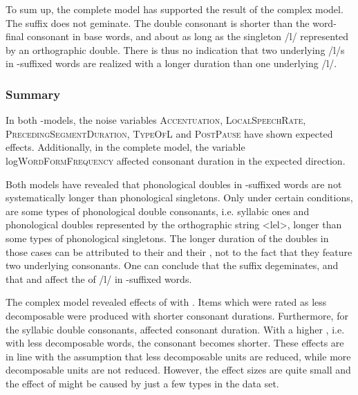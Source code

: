 To sum up, the complete model has supported the result of the complex model. The suffix  does not geminate. The double consonant is shorter than the word-final consonant in base words, and about as long as the singleton /l/ represented by an orthographic double. There is thus no indication that two underlying /l/s in -suffixed words are realized with a longer duration than one underlying /l/.




\subsubsection{Summary} \label{ly experiment summary}

In both -models, the noise variables \textsc{Accentuation}, \textsc{LocalSpeechRate}, \textsc{PrecedingSegmentDuration}, \textsc{TypeOfL} and \textsc{PostPause} have shown expected effects. Additionally, in the complete model, the variable log\textsc{WordFormFrequency} affected consonant duration in the expected direction.

Both models have revealed that phonological doubles in -suffixed words are not systematically longer than phonological singletons. Only under certain conditions, are some types of phonological double consonants, i.e. syllabic ones and phonological doubles represented by the orthographic string <lel>, longer than some types of phonological singletons. The longer duration of the doubles in those cases can be attributed to their  and their , not to the fact that they feature two underlying consonants. 
One can conclude that the suffix  degeminates, and that  and  affect the  of /l/ in -suffixed words. 

The complex model revealed effects of  with . Items which were rated as less decomposable were produced with shorter consonant durations. Furthermore, for the syllabic double consonants,  affected consonant duration. With a higher , i.e. with less decomposable words, the consonant becomes shorter. 
These effects are in line with the assumption that less decomposable units are reduced, while more decomposable units are not reduced. However, the effect sizes are quite small and the effect of  might be caused by just a few types in the data set. 

